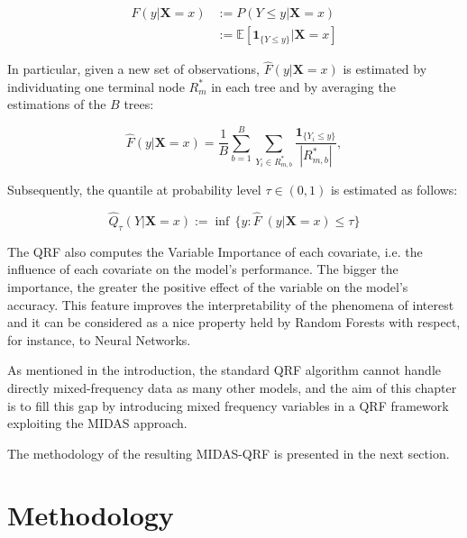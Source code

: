 \begin{equation}
	\label{eq:qrfconddistr}
	\begin{aligned}
		F(y|\mathbf{X}=x)
		&:=P(Y\leq y|\mathbf{X}=x )\\
		&:=\mathbb{E}[\mathbf{1}_{\{Y\leq y\}}|\mathbf{X}=x]
	\end{aligned}
\end{equation}

\noindent In particular, given a new set of observations, $\hat{F}(y|\mathbf{X}=x)$ is estimated by individuating one terminal node $R^{*}_m$ in each tree and by averaging the estimations of the $B$ trees:

\begin{equation}
		\hat{F}(y|\mathbf{X}=x )=\frac{1}{B}\sum_{b=1}^{B}\sum_{Y_i \in {R^{*}_{m,b}}} \frac{\mathbf{1}_{\{Y_{i}\leq y\}}}{|{R^{*}_{m,b}}|} ,
	\end{equation}

\noindent Subsequently, the quantile at probability level $\tau \in (0,1)$ is estimated as follows:

\begin{equation}
\hat{Q}_{\tau}(Y|\mathbf{X}=x) := \inf \, \{y : \widehat{F} \; (y|\mathbf{X}=x ) \leq \tau\}
\end{equation}

\noindent The QRF also computes the Variable Importance of each covariate, i.e. the influence of each covariate on the model's performance. The bigger the importance, the greater the positive effect of the variable on the model's accuracy. This feature improves the interpretability of the phenomena of interest and it can be considered as a nice property held by Random Forests with respect, for instance, to Neural Networks. 

\vspace{0.15in}

\noindent As mentioned in the introduction, the standard QRF algorithm cannot handle directly mixed-frequency data as many other models, and the aim of this chapter is to fill this gap by introducing mixed frequency variables in a QRF framework exploiting the MIDAS approach. 

\vspace{0.15in}

\noindent The methodology of the resulting MIDAS-QRF is presented in the next section.


\section{Methodology}
\label{sec:MIDAS-QRF-methodology}

